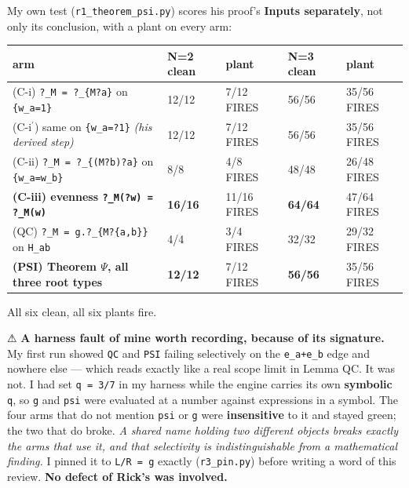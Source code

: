 \documentclass[11pt,a4paper]{article}
\begin{document}
My own test (\mbox{\texttt{r1\_theorem\_psi.py}}) scores his proof's \textbf{Inputs separately}, not only its conclusion, with a plant on every arm:

\begin{center}\footnotesize
\begin{tabular}{@{}p{}p{}p{}p{}p{}@{}}
\hline
\textbf{arm} & \textbf{N=2 clean} & \textbf{plant} & \textbf{N=3 clean} & \textbf{plant}\\ \hline
(C-i) \mbox{\texttt{?\_M = ?\_\{M?a\}}} on \mbox{\texttt{\{w\_a=1\}}} & 12/12 & 7/12 FIRES & 56/56 & 35/56 FIRES\\
(C-i$^{\prime}$) same on \mbox{\texttt{\{w\_a=?1\}}} \emph{(his derived step)} & 12/12 & 7/12 FIRES & 56/56 & 35/56 FIRES\\
(C-ii) \mbox{\texttt{?\_M = ?\_\{(M?b)?a\}}} on \mbox{\texttt{\{w\_a=w\_b\}}} & 8/8 & 4/8 FIRES & 48/48 & 26/48 FIRES\\
\textbf{(C-iii) evenness \mbox{\texttt{?\_M(?w) = ?\_M(w)}}} & \textbf{16/16} & 11/16 FIRES & \textbf{64/64} & 47/64 FIRES\\
(QC) \mbox{\texttt{?\_M = g.?\_\{M?\{a,b\}\}}} on \mbox{\texttt{H\_ab}} & 4/4 & 3/4 FIRES & 32/32 & 29/32 FIRES\\
\textbf{(PSI) Theorem $\Psi$, all three root types} & \textbf{12/12} & 7/12 FIRES & \textbf{56/56} & 35/56 FIRES\\
\hline\end{tabular}\end{center}

All six clean, all six plants fire.

⚠ \textbf{A harness fault of mine worth recording, because of its signature.} My first run showed \mbox{\texttt{QC}} and \mbox{\texttt{PSI}} failing selectively on the \mbox{\texttt{e\_a+e\_b}} edge and nowhere else --- which reads exactly like a real scope limit in Lemma QC. It was not. I had set \mbox{\texttt{q = 3/7}} in my harness while the engine carries its own \textbf{symbolic} \mbox{\texttt{q}}, so \mbox{\texttt{g}} and \mbox{\texttt{psi}} were evaluated at a number against expressions in a symbol. The four arms that do not mention \mbox{\texttt{psi}} or \mbox{\texttt{g}} were \textbf{insensitive} to it and stayed green; the two that do broke. \emph{A shared name holding two different objects breaks exactly the arms that use it, and that selectivity is indistinguishable from a mathematical finding.} I pinned it to \mbox{\texttt{L/R = g}} exactly (\mbox{\texttt{r3\_pin.py}}) before writing a word of this review. \textbf{No defect of Rick's was involved.}
\end{document}
